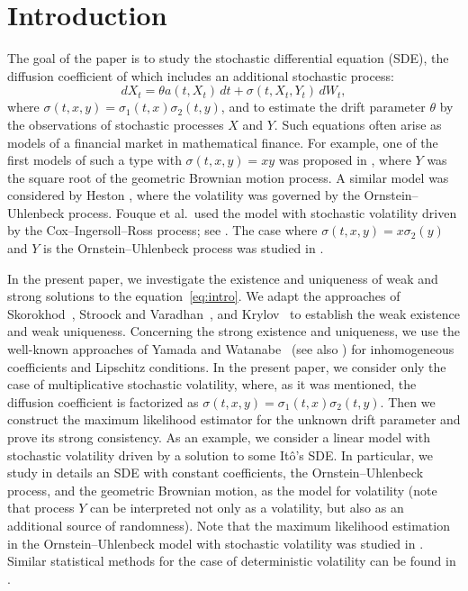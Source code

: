 \documentclass[numbers,compress,v1.0.1]{vmsta}
\theoremstyle{remark}
\begin{document}
\section{Introduction}
The goal of the paper is to study the
stochastic differential equation (SDE), the diffusion coefficient of
which includes an additional stochastic process:
%
\begin{equation}
\label{eq:intro} dX_t = \theta a(t,X_t)\,dt +
\sigma(t,X_t, Y_t)\,dW_t,
\end{equation}
%
where $\sigma(t,x,y) = \sigma_1(t,x) \sigma_2(t,y)$, and to
estimate the drift parameter $\theta$ by the observations of stochastic
processes $X$ and $Y$.
Such equations often arise as models of a financial market in
mathematical finance.
For example, one of the first models of such a type with $\sigma(t,x,
y)= xy$ was proposed in \cite{hull}, where $Y$ was the square root of
the geometric Brownian motion process.
A similar model was considered by Heston \cite{hes}, where the
volatility was governed by the Ornstein--Uhlenbeck process.
Fouque et al.\ used the model with stochastic volatility driven by the
Cox--Ingersoll--Ross process; see \cite{fou1,fou2}.
The case where $\sigma(t,x, y)= x \sigma_2(y)$ and $Y$ is the
Ornstein--Uhlenbeck process was studied in \cite{kuc1,kuc2}.

In the present paper, we investigate the existence and uniqueness of
weak and strong solutions to the equation~\eqref{eq:intro}.
We adapt the approaches of Skorokhod~\cite{Skorokhod65}, Stroock and
Varadhan~\cite{stroock,stroock2}, and Krylov~\cite{kryy,KRY} to
establish the weak existence and weak uniqueness. Concerning the strong
existence and uniqueness, we use the well-known approaches of Yamada
and Watanabe~\cite{wat1} (see also \cite{Alta}) for inhomogeneous
coefficients and Lipschitz conditions. In the present paper, we
consider only the case of multiplicative stochastic volatility, where,
as it was mentioned, the diffusion coefficient is factorized as $\sigma
(t,x,y) = \sigma_1(t,x) \sigma_2(t,y)$.
Then we construct the maximum likelihood estimator for the unknown
drift parameter and prove its strong consistency.
As an example, we consider a linear model with stochastic volatility
driven by a solution to some It\^{o}'s SDE. In particular, we study in
details an SDE with constant coefficients, the Ornstein--Uhlenbeck
process, and the geometric Brownian motion, as the model for volatility
(note that process $Y$ can be interpreted not only as a volatility, but
also as an additional source of randomness).
Note that the maximum likelihood estimation in the Ornstein--Uhlenbeck
model with stochastic volatility was studied in \cite{ait-sahalia}.
Similar statistical methods for the case of deterministic volatility
can be found in \cite{hey,jan,liptser-stat2,mis}.
\end{document}
